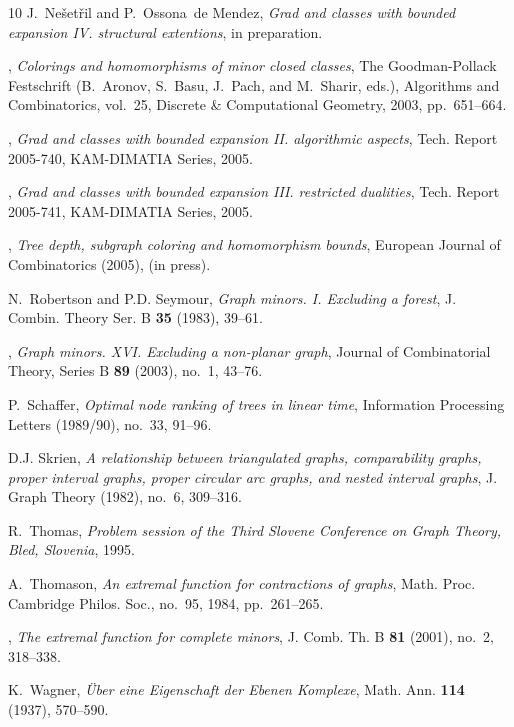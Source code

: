 \documentclass[a4paper]{amsart}
\theoremstyle{definition}
\theoremstyle{remark}
\begin{document}
\begin{thebibliography}{10}
J.~Ne{\v s}et{\v r}il and P.~Ossona~de Mendez, \emph{Grad and classes with
  bounded expansion {IV}. structural extentions}, in preparation.

\bysame, \emph{Colorings and homomorphisms of minor closed classes}, The
  Goodman-Pollack Festschrift (B.~Aronov, S.~Basu, J.~Pach, and M.~Sharir,
  eds.), Algorithms and Combinatorics, vol.~25, {D}iscrete {\&} {C}omputational
  {G}eometry, 2003, pp.~651--664.

\bysame, \emph{Grad and classes with bounded expansion {II}. algorithmic
  aspects}, Tech. Report 2005-740, {K}{A}{M}-{D}{I}{M}{A}{T}{I}{A} {S}eries,
  2005.

\bysame, \emph{Grad and classes with bounded expansion {III}. restricted
  dualities}, Tech. Report 2005-741, {K}{A}{M}-{D}{I}{M}{A}{T}{I}{A} {S}eries,
  2005.

\bysame, \emph{Tree depth, subgraph coloring and homomorphism bounds}, European
  Journal of Combinatorics (2005), (in press).

N.~Robertson and P.D. Seymour, \emph{Graph minors. {I}. {E}xcluding a forest},
  J. Combin. Theory Ser. B \textbf{35} (1983), 39--61.

\bysame, \emph{Graph minors. {XVI}. {E}xcluding a non-planar graph}, Journal of
  Combinatorial Theory, Series B \textbf{89} (2003), no.~1, 43--76.

P.~Schaffer, \emph{Optimal node ranking of trees in linear time}, Information
  Processing Letters (1989/90), no.~33, 91--96.

D.J. Skrien, \emph{A relationship between triangulated graphs, comparability
  graphs, proper interval graphs, proper circular arc graphs, and nested
  interval graphs}, J. Graph Theory (1982), no.~6, 309--316.

R.~Thomas, \emph{Problem session of the {T}hird {S}lovene {C}onference on
  {G}raph {T}heory, {B}led, {S}lovenia}, 1995.

A.~Thomason, \emph{An extremal function for contractions of graphs}, Math.
  Proc. Cambridge Philos. Soc., no.~95, 1984, pp.~261--265.

\bysame, \emph{The extremal function for complete minors}, J. Comb. Th. B
  \textbf{81} (2001), no.~2, 318--338.

K.~Wagner, \emph{{\"U}ber eine {E}igenschaft der {E}benen {K}omplexe}, Math.
  Ann. \textbf{114} (1937), 570--590.

\end{thebibliography}
\end{document}
